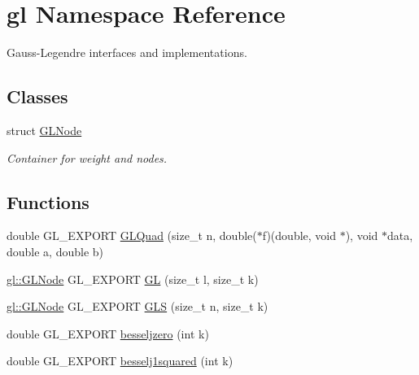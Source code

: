 \hypertarget{namespacegl}{\section{gl Namespace Reference}
\label{namespacegl}
}


Gauss-\/\+Legendre interfaces and implementations.  


\subsection*{Classes}
\begin{DoxyCompactItemize}
\item 
struct \hyperlink{structgl_1_1GLNode}{G\+L\+Node}
\begin{DoxyCompactList}\small\item\em Container for weight and nodes. \end{DoxyCompactList}\end{DoxyCompactItemize}
\subsection*{Functions}
\begin{DoxyCompactItemize}
\item 
double G\+L\+\_\+\+E\+X\+P\+O\+R\+T \hyperlink{namespacegl_a8dfc38fe28db34846c60086d6ecf508c}{G\+L\+Quad} (size\+\_\+t n, double($\ast$f)(double, void $\ast$), void $\ast$data, double a, double b)
\item 
\hyperlink{structgl_1_1GLNode}{gl\+::\+G\+L\+Node} G\+L\+\_\+\+E\+X\+P\+O\+R\+T \hyperlink{namespacegl_aa2fa29b0a69c2eeb23b4e0b9613e7fc5}{G\+L} (size\+\_\+t l, size\+\_\+t k)
\item 
\hyperlink{structgl_1_1GLNode}{gl\+::\+G\+L\+Node} G\+L\+\_\+\+E\+X\+P\+O\+R\+T \hyperlink{namespacegl_a7f251958ee6d2c65e37b0f9e61a9fe30}{G\+L\+S} (size\+\_\+t n, size\+\_\+t k)
\item 
double G\+L\+\_\+\+E\+X\+P\+O\+R\+T \hyperlink{namespacegl_a516dc08710fc7a9d7f455203bcd9a358}{besseljzero} (int k)
\item 
double G\+L\+\_\+\+E\+X\+P\+O\+R\+T \hyperlink{namespacegl_a8a87a797409c579a3658648f68de3d8a}{besselj1squared} (int k)
\end{DoxyCompactItemize}
